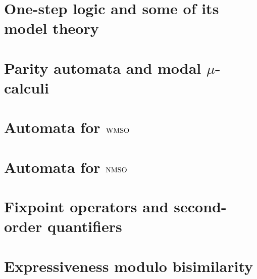 \documentclass[prodmode,acmtecs]{acmsmall} %
\begin{document}
\clearpage

\section{One-step logic and some of its model theory}\label{sec:onestep}

\clearpage

\section{Parity automata and modal $\mu$-calculi}\label{sec:parityaut}


\clearpage

\section{Automata for $\mathrm{WMSO}$}\label{sec:autwmso}

\clearpage

\section{Automata for $\mathrm{NMSO}$}\label{sec:autnmso}

\clearpage

\section{Fixpoint operators and second-order quantifiers}


\clearpage

\clearpage

\section{Expressiveness modulo bisimilarity}\label{sec:expresso}






\end{document}

